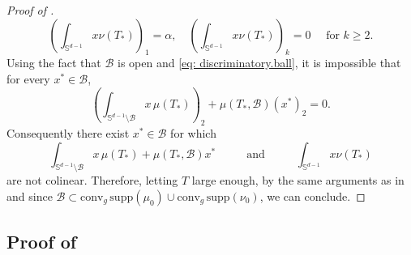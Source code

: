 \documentclass[a4paper,11pt]{article}
\theoremstyle{plain}
\newcommand{\supp}{\mathrm{supp}}
\newcommand{\conv}{\mathrm{conv}}
\renewcommand{\S}{\mathbb{S}^{d-1}}
\renewcommand{\geq}{\geqslant}
\numberwithin{equation}{section}
\begin{document}
\begin{proof}[Proof of ]
\begin{equation*}
        \left(\int_{\S} x\nu(T_*)\right)_1=\alpha,\quad \left(\int_{\S} x\nu(T_*)\right)_k=0\quad \text{ for }k\geq 2.
    \end{equation*}
    Using the fact that $\mathscr{B}$ is open {and \eqref{eq: discriminatory.ball}}, it is impossible that for every $x^*\in \mathscr{B}$,
    \begin{equation*}
        \left(\int_{\S\setminus\mathscr{B}} x\,\mu(T_*)\right)_2+\mu(T_*, \mathscr{B})(x^*)_2=0.
    \end{equation*}
    Consequently there exist $x^*\in \mathscr{B}$ for which 
\begin{equation*}
    \int_{\S\setminus\mathscr{B}} x\,\mu(T_*)+\mu(T_*, \mathscr{B})x^* \hspace{1cm}\text{ and } \hspace{1cm}\int_{\S} x\nu(T_*)
\end{equation*}
are not colinear. Therefore, letting $T$ large enough, by the same arguments as in  {and since $\mathscr{B}\subset \conv_g\,\supp(\mu_0)\cup \conv_g\,\supp(\nu_0)$}, we can conclude. 
\end{proof}



\subsection{\texorpdfstring{Proof of }{Proof of Lemma}}
\label{proof: hyp.propagation}
\end{document}
